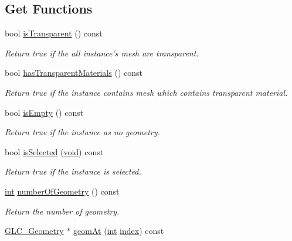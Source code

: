 \subsection*{Get Functions}
\begin{DoxyCompactItemize}
\item 
bool \hyperlink{class_g_l_c__3_d_view_instance_ac09a29297ab261189e2217c2d8e5c8b2}{is\-Transparent} () const 
\begin{DoxyCompactList}\small\item\em Return true if the all instance's mesh are transparent. \end{DoxyCompactList}\item 
bool \hyperlink{class_g_l_c__3_d_view_instance_a8c072cc54b01a9ded003c4e1f09feca8}{has\-Transparent\-Materials} () const 
\begin{DoxyCompactList}\small\item\em Return true if the instance contains mesh which contains transparent material. \end{DoxyCompactList}\item 
bool \hyperlink{class_g_l_c__3_d_view_instance_a44a73b9ef95c3abb5751fd64cd5b725f}{is\-Empty} () const 
\begin{DoxyCompactList}\small\item\em Return true if the instance as no geometry. \end{DoxyCompactList}\item 
bool \hyperlink{class_g_l_c__3_d_view_instance_ab3848c52e389a01ea0af10fe6b100757}{is\-Selected} (\hyperlink{group___u_a_v_objects_plugin_ga444cf2ff3f0ecbe028adce838d373f5c}{void}) const 
\begin{DoxyCompactList}\small\item\em Return true if the instance is selected. \end{DoxyCompactList}\item 
\hyperlink{ioapi_8h_a787fa3cf048117ba7123753c1e74fcd6}{int} \hyperlink{class_g_l_c__3_d_view_instance_a84158a8cbba5b89f76aea76d42831bf7}{number\-Of\-Geometry} () const 
\begin{DoxyCompactList}\small\item\em Return the number of geometry. \end{DoxyCompactList}\item 
\hyperlink{class_g_l_c___geometry}{G\-L\-C\-\_\-\-Geometry} $\ast$ \hyperlink{class_g_l_c__3_d_view_instance_a63076e600bf546c502d3848933ad3da2}{geom\-At} (\hyperlink{ioapi_8h_a787fa3cf048117ba7123753c1e74fcd6}{int} \hyperlink{glext_8h_ab47dd9958bcadea08866b42bf358e95e}{index}) const 

\end{DoxyCompactItemize}
